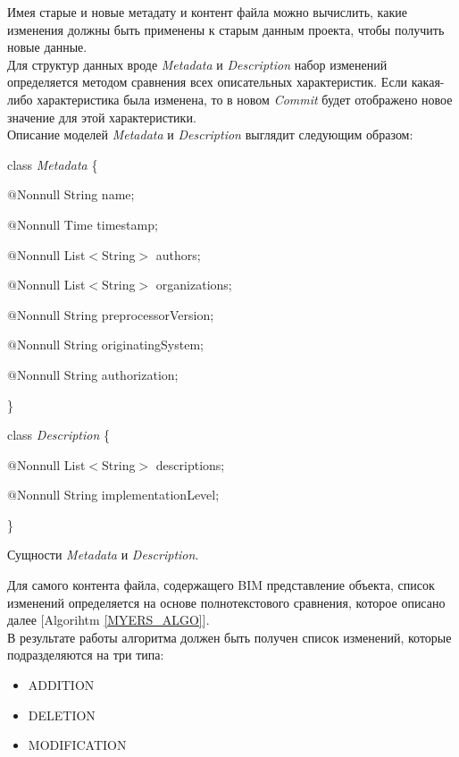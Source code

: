 \documentclass[a4paper,14pt]{extreport} %
\begin{document}
\newpage
Имея старые и новые метадату и контент файла можно вычислить, какие изменения должны быть применены к старым данным проекта, чтобы получить новые данные. \\

Для структур данных вроде \textit{Metadata} и \textit{Description} набор изменений определяется методом сравнения всех описательных характеристик. Если какая-либо характеристика была изменена, то в новом \textit{Commit} будет отображено новое значение для этой характеристики. \\
Описание моделей \textit{Metadata} и \textit{Description} выглядит следующим образом:
\begin{algorithm}[H]
class \textit{Metadata} \{

	\hspace{0.5cm}$@$Nonnull 		String 						name;
	
	\hspace{0.5cm}$@$Nonnull		Time							timestamp;
	
	\hspace{0.5cm}$@$Nonnull		List$<$String$>$		authors;
	
	\hspace{0.5cm}$@$Nonnull		List$<$String$>$		organizations;
	
	\hspace{0.5cm}$@$Nonnull		String						preprocessorVersion;
	
	\hspace{0.5cm}$@$Nonnull		String						originatingSystem;
	
	\hspace{0.5cm}$@$Nonnull		String						authorization;
	
\}

class \textit{Description} \{

	\hspace{0.5cm}$@$Nonnull		List$<$String$>$ 		descriptions;
	
	\hspace{0.5cm}$@$Nonnull		String			 			implementationLevel;
	
\}
\caption{Сущности \textit{Metadata} и \textit{Description}.}
\label{entity_metadata-and-description}
\end{algorithm}

Для самого контента файла, содержащего BIM представление объекта, список изменений определяется на основе полнотекстового сравнения, которое описано далее [Algorihtm \ref{MYERS_ALGO}]. \\
В результате работы алгоритма должен быть получен список изменений, которые подразделяются на три типа:
\begin{itemize}
\item ADDITION
\item DELETION
\item MODIFICATION
\end{itemize}
\end{document}
